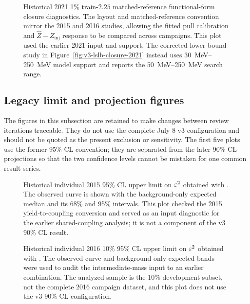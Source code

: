 \begin{figure}[p]
\centering
{}

\vspace{0.35em}

\caption{Historical 2021 1\% train-$2.25$ matched-reference functional-form closure
diagnostics. The layout and matched-reference convention mirror the 2015 and 2016
studies, allowing the fitted pull calibration and $\hat Z-Z_{\mathrm{inj}}$ response
to be compared across campaigns. This plot used the earlier 2021 input and support.
The corrected lower-bound study in Figure~\ref{fig:v3-lslb-closure-2021} instead uses
\SIrange{30}{250}{MeV} model support and reports the
\SIrange{50}{250}{MeV} search range.}
\label{fig:refmatched-train225-closure-2021}
\end{figure}

\FloatBarrier

\subsection{Legacy limit and projection figures}

The figures in this subsection are retained to make changes between review iterations
traceable. They do not use the complete July 8 v3 configuration and should not be
quoted as the present exclusion or sensitivity. The first five plots use the former
95\% CL convention; they are separated from the later 90\% CL projections so that the
two confidence levels cannot be mistaken for one common result series.

\begin{figure}[p]
\centering
{}
\caption{Historical individual 2015 95\% CL upper limit on $\varepsilon^2$ obtained with
\CLs{}. The observed curve is shown with the background-only expected median and its
68\% and 95\% intervals. This plot checked the 2015 yield-to-coupling conversion and
served as an input diagnostic for the earlier shared-coupling analysis; it is not a
component of the v3 90\% CL result.}
\label{fig:app-legacy-95-individuals}
\end{figure}

\begin{figure}[p]
\centering
{}
\caption{Historical individual 2016 10\% 95\% CL upper limit on $\varepsilon^2$ obtained
with \CLs{}. The observed curve and background-only expected bands were used to audit
the intermediate-mass input to an earlier combination. The analyzed sample is the
10\% development subset, not the complete 2016 campaign dataset, and this plot does
not use the v3 90\% CL configuration.}
\label{fig:app-legacy-95-individual-2016}
\end{figure}

